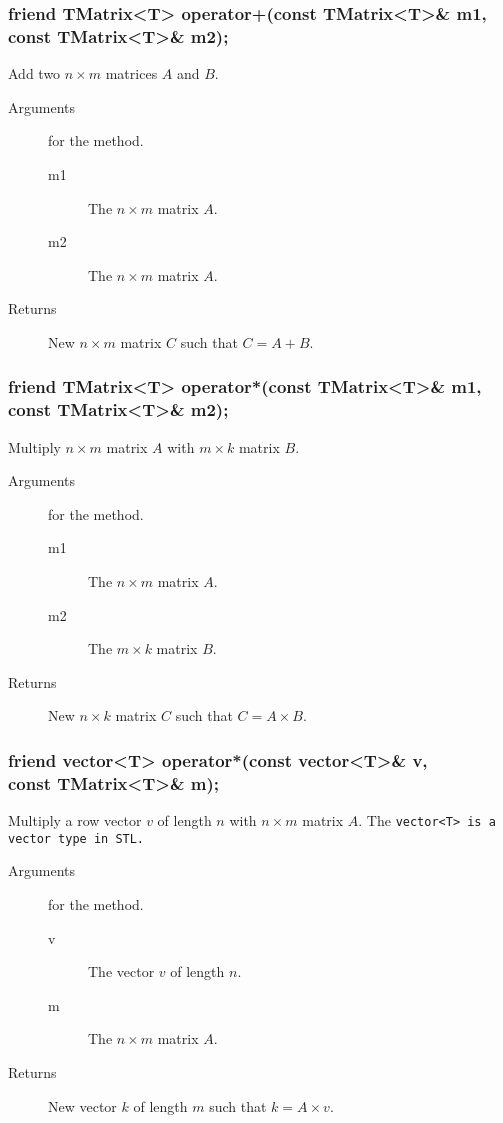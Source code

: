 \subsubsection{friend TMatrix<T> operator+(const TMatrix<T>\& m1, \\
                                           const TMatrix<T>\& m2);}
Add two $n \times m$ matrices $A$ and $B$.
\begin{description}
  \item [Arguments] for the method.
    \begin{description}
      \item [m1] The  $n \times m$ matrix $A$.
      \item [m2] The  $n \times m$ matrix $A$.
    \end{description}
  \item [Returns] New  $n \times m$ matrix $C$ such that $C = A + B$.
\end{description}

\subsubsection{friend TMatrix<T> operator*(const TMatrix<T>\& m1,\\
                                            const TMatrix<T>\& m2);}
Multiply $n \times m$ matrix $A$ with $m \times k$ matrix $B$.
\begin{description} 
  \item[Arguments] for the method.
    \begin{description}
      \item [m1] The  $n \times m$ matrix $A$.
      \item [m2] The  $m \times k$ matrix $B$.
    \end{description}
   \item [Returns] New $n \times k$ matrix $C$ such that $C = A \times B$.
\end{description}

\subsubsection{friend vector<T> operator*(const vector<T>\& v,\\
                                          const TMatrix<T>\& m);}
Multiply a row vector $v$ of length $n$ with $n \times m$ matrix $A$.
The \tt vector<T> \rm is a vector type in STL.
\begin{description}
  \item[Arguments] for the method.
   \begin{description}
     \item [v] The vector $v$ of length $n$.
     \item [m] The $n \times m$ matrix $A$.
   \end{description} 
  \item [Returns] New vector $k$ of length $m$ such that  $k = A \times v$.
\end{description} 


